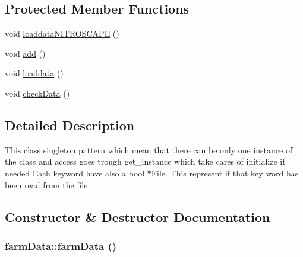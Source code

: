 \subsection*{Protected Member Functions}
\begin{DoxyCompactItemize}
\item 
void \hyperlink{classfarm_data_a876db3cf0dd016c20f850a14ec435f1d}{loaddataNITROSCAPE} ()
\item 
void \hyperlink{classfarm_data_a0e7b5f2a247620c8b77b1fa0050ff3ee}{add} ()
\item 
void \hyperlink{classfarm_data_acc1cdf104c536ccf1c9d882dbdd23741}{loaddata} ()
\item 
void \hyperlink{classfarm_data_aa64f203450f21d7a71e80a18a3936f55}{checkData} ()
\end{DoxyCompactItemize}


\subsection{Detailed Description}
This class singleton pattern which mean that there can be only one instance of the class and access goes trough get\_\-instance which take cares of initialize if needed Each keyword have also a bool $\ast$File. This represent if that key word has been read from the file 

\subsection{Constructor \& Destructor Documentation}
\hypertarget{classfarm_data_afd7275ecdb30721e5f6221026b4c56ba}{
\subsubsection[{farmData}]{\setlength{\rightskip}{0pt plus 5cm}farmData::farmData ()}}
\label{classfarm_data_afd7275ecdb30721e5f6221026b4c56ba}


